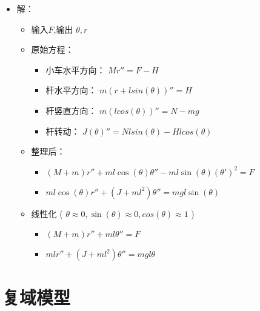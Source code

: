 \documentclass{article}
\begin{document}
\begin{frame}
\begin{itemize}



\item 解：\\
\label{sec-1-5-1-2}%
\begin{itemize}
\item 输入$F$,输出 $\theta,r$
\item 原始方程：
\begin{itemize}
\item 小车水平方向： $Mr''=F-H$
\item 杆水平方向： $m(r+l sin(\theta))'' = H$
\item 杆竖直方向： $m (l cos(\theta))'' = N-mg$
\item 杆转动： $J(\theta)''=N l sin(\theta) - H l cos(\theta)$
\end{itemize}
\item 整理后：
\begin{itemize}
\item $(M+m)r''+ml\cos(\theta)\theta''-ml\sin(\theta)(\theta')^2=F$
\item $ml\cos(\theta)r''+(J+m l^2)\theta''=mgl\sin(\theta)$
\end{itemize}
\item 线性化 ( $\theta\approx 0,\sin(\theta)\approx 0,cos(\theta)\approx 1$ )
\begin{itemize}
\item $(M+m)r''+ml\theta'' = F$
\item $ml r'' +(J+ml^2)\theta''=mgl\theta$
\end{itemize}
\end{itemize}




\end{itemize} %
\end{frame}
\section{复域模型}
\label{sec-2}
\end{document}
